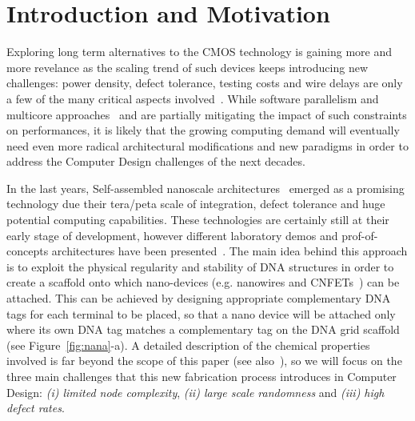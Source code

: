 
\section{Introduction and Motivation}

Exploring long term alternatives to the CMOS technology is gaining
more and more revelance as the scaling trend of such devices keeps
introducing new challenges: power density, defect tolerance, testing
costs and wire delays are only a few of the many critical aspects
involved~\cite{itrs13}. 
While software parallelism and multicore
approaches~\cite{horowitz2004} and \cite{powell2009} are partially mitigating the impact of such
constraints on performances, it is likely that the growing computing demand will
eventually need even more radical architectural modifications and new
paradigms in order to address the Computer Design challenges of the next
decades.

In the last years, Self-assembled nanoscale architectures~\cite{yan2003}
emerged as a promising technology due their tera/peta scale of
integration, defect tolerance and huge potential computing
capabilities. These technologies are certainly still at
their early stage of development, however different laboratory demos and
prof-of-concepts architectures have been presented~\cite{patwardhan2004, patwardhan2006_1, pistol2009}.
The main idea behind this approach is to exploit the physical regularity and
stability of DNA structures in order to create a scaffold onto which
nano-devices (e.g. nanowires and CNFETs~\cite{bachtold2001, tans1998, cui2001}) can be
attached. This can be achieved by designing appropriate complementary DNA tags for
each terminal to be placed, so that a nano device will be attached
only where its own DNA tag matches a complementary tag on the DNA grid
scaffold (see Figure~\ref{fig:nana}-a).
A detailed description of the chemical properties involved is far
beyond the scope of this paper (see also~\cite{braun1998, seeman1999}), so we will focus on
the three main challenges that this new fabrication process introduces
in Computer Design: \emph{(i) limited node complexity}, \emph{(ii) large scale
randomness} and \emph{(iii) high defect rates}.  

